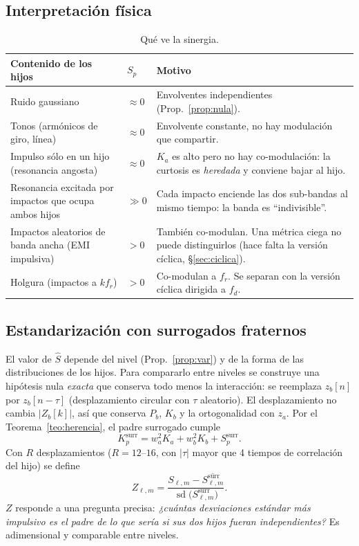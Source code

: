 \documentclass[11pt,a4paper]{article}
\theoremstyle{definition}
\theoremstyle{remark}
\begin{document}
\subsection{Interpretación física}
\begin{table}[!htb]
\centering\small
\begin{tabularx}{\textwidth}{@{}p{4.3cm}p{2.3cm}X@{}}
\toprule
Contenido de los hijos & $S_p$ & Motivo \\
\midrule
Ruido gaussiano & $\approx0$ & Envolventes independientes (Prop.~\ref{prop:nula}). \\
Tonos (armónicos de giro, línea) & $\approx0$ & Envolvente constante, no hay modulación que compartir. \\
Impulso sólo en un hijo (resonancia angosta) & $\approx0$ & $K_a$ es alto pero no hay co-modulación: la curtosis es \emph{heredada} y conviene bajar al hijo. \\
Resonancia excitada por impactos que ocupa ambos hijos & $\gg0$ & Cada impacto enciende las dos sub-bandas al mismo tiempo: la banda es ``indivisible''. \\
Impactos aleatorios de banda ancha (EMI impulsiva) & $>0$ & También co-modulan. Una métrica ciega no puede distinguirlos (hace falta la versión cíclica, §\ref{sec:ciclica}). \\
Holgura (impactos a $k f_r$) & $>0$ & Co-modulan a $f_r$. Se separan con la versión cíclica dirigida a $f_d$. \\
\bottomrule
\end{tabularx}
\caption{Qué ve la sinergia.}
\end{table}

\subsection{Estandarización con surrogados fraternos}
El valor de $\hat S$ depende del nivel (Prop.~\ref{prop:var}) y de la forma de las distribuciones de los hijos. Para compararlo entre niveles se construye una hipótesis nula \emph{exacta} que conserva todo menos la interacción: se reemplaza $z_b[n]$ por $z_b[n-\tau]$ (desplazamiento circular con $\tau$ aleatorio). El desplazamiento no cambia $|Z_b[k]|$, así que conserva $P_b$, $K_b$ y la ortogonalidad con $z_a$. Por el Teorema~\ref{teo:herencia}, el padre surrogado cumple
\[
K_p^{\text{surr}}=w_a^2K_a+w_b^2K_b+S_p^{\text{surr}} .
\]
Con $R$ desplazamientos ($R=12$--$16$, con $|\tau|$ mayor que 4 tiempos de correlación del hijo) se define
\begin{equation}\label{eq:Z}
Z_{\ell,m}=\frac{S_{\ell,m}-\overline{S^{\text{surr}}_{\ell,m}}}{\operatorname{sd}\big(S^{\text{surr}}_{\ell,m}\big)} .
\end{equation}
$Z$ responde a una pregunta precisa: \emph{¿cuántas desviaciones estándar más impulsivo es el padre de lo que sería si sus dos hijos fueran independientes?} Es adimensional y comparable entre niveles.
\end{document}
